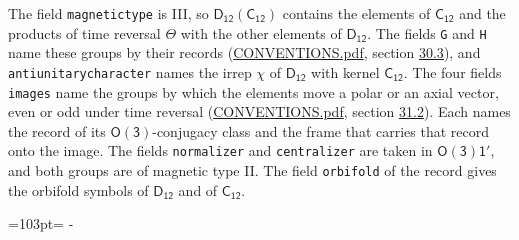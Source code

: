 \documentclass[10pt,a4paper]{article}
\newcommand{\needspace}[1]{\par\penalty-100\begingroup\dimen0=#1\relax\dimen2=\pagegoal
  \advance\dimen2-\pagetotal\ifdim\dimen0>\dimen2\relax\ifdim\dimen2>0pt\vfil\break\fi\fi
  \endgroup}
\numberwithin{equation}{section}
\newcommand{\grp}[1]{\mathsf{#1}}
\begin{document}
The field \texttt{magnetictype} is III, so $\grp{D_{12}}(\grp{C_{12}})$ contains the elements of $\grp{C_{12}}$ and the products of time reversal $\varTheta$ with the other elements of $\grp{D_{12}}$. The fields \texttt{G} and \texttt{H} name these groups by their records (\href{../../CONVENTIONS.pdf}{CONVENTIONS.pdf}, section \href{../../CONVENTIONS.pdf\#conv.30.3}{30.3}), and \texttt{antiunitarycharacter} names the irrep $\chi$ of $\grp{D_{12}}$ with kernel $\grp{C_{12}}$. The four fields \texttt{images} name the groups by which the elements move a polar or an axial vector, even or odd under time reversal (\href{../../CONVENTIONS.pdf}{CONVENTIONS.pdf}, section \href{../../CONVENTIONS.pdf\#conv.31.2}{31.2}). Each names the record of its $\grp{O(3)}$-conjugacy class and the frame that carries that record onto the image. The fields \texttt{normalizer} and \texttt{centralizer} are taken in $\grp{O(3)1'}$, and both groups are of magnetic type II. The field \texttt{orbifold} of the record gives the orbifold symbols of $\grp{D_{12}}$ and of $\grp{C_{12}}$.
\needspace{103pt}
\end{document}
